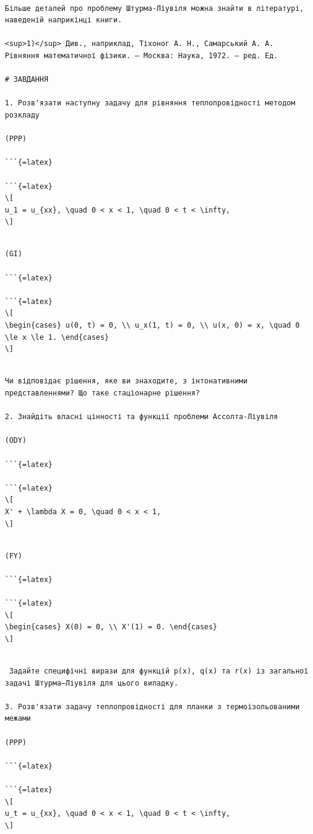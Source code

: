 \documentclass[
]{article}
\begin{document}
\begin{verbatim}

Більше деталей про проблему Штурма-Ліувіля можна знайти в літературі, наведеній наприкінці книги.

<sup>1)</sup> Див., наприклад, Тіхоног А. Н., Самарський А. А. Рівняння математичної фізики. — Москва: Наука, 1972. — ред. Ед.

# ЗАВДАННЯ

1. Розв'язати наступну задачу для рівняння теплопровідності методом розкладу

(PPP)

```{=latex}

```{=latex}
\[
u_1 = u_{xx}, \quad 0 < x < 1, \quad 0 < t < \infty,
\]
\end{verbatim}

\begin{verbatim}

(GI)

```{=latex}

```{=latex}
\[
\begin{cases} u(0, t) = 0, \\ u_x(1, t) = 0, \\ u(x, 0) = x, \quad 0 \le x \le 1. \end{cases}
\]
\end{verbatim}

\begin{verbatim}

Чи відповідає рішення, яке ви знаходите, з інтонативними представленнями? Що таке стаціонарне рішення?

2. Знайдіть власні цінності та функції проблеми Ассолта-Ліувіля

(ODY)

```{=latex}

```{=latex}
\[
X' + \lambda X = 0, \quad 0 < x < 1,
\]
\end{verbatim}

\begin{verbatim}

(FY) 

```{=latex}

```{=latex}
\[
\begin{cases} X(0) = 0, \\ X'(1) = 0. \end{cases}
\]
\end{verbatim}

\begin{verbatim}

 Задайте специфічні вирази для функцій p(x), q(x) та r(x) із загальної задачі Штурма–Ліувіля для цього випадку.

3. Розв'язати задачу теплопровідності для планки з термоізольованими межами

(PPP)

```{=latex}

```{=latex}
\[
u_t = u_{xx}, \quad 0 < x < 1, \quad 0 < t < \infty,
\]
\end{verbatim}
\end{document}
